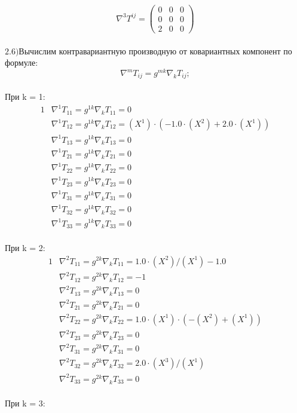 \documentclass[a4paper, 12pt, oneside]{article}
\begin{document}
\[
\nabla^3T^{ij} = \begin{pmatrix}
	0 & 0 & 0\\
	0 & 0 & 0\\
	2 & 0 & 0
\end{pmatrix}
\]\\
$\mathrm{2.6) }$Вычислим контравариантную производную от ковариантных компонент по формуле:\\
\[
\nabla^mT_{ij} = g^{mk}\nabla_kT_{ij};
\]\\
При k = 1:\\
\begin{alignat*}{1}
  & \nabla^1T_{11} = g^{1k}\nabla_kT_{11} = 0 \\
  & \nabla^1T_{12} = g^{1k}\nabla_kT_{12} = (X^1)\cdot (-1.0\cdot (X^2) + 2.0\cdot (X^1)) \\
  & \nabla^1T_{13} = g^{1k}\nabla_kT_{13} = 0 \\
  & \nabla^1T_{21} = g^{1k}\nabla_kT_{21} = 0 \\
  & \nabla^1T_{22} = g^{1k}\nabla_kT_{22} = 0 \\
  & \nabla^1T_{23} = g^{1k}\nabla_kT_{23} = 0 \\
  & \nabla^1T_{31} = g^{1k}\nabla_kT_{31} = 0 \\
  & \nabla^1T_{32} = g^{1k}\nabla_kT_{32} = 0 \\
  & \nabla^1T_{33} = g^{1k}\nabla_kT_{33} = 0 
\end{alignat*}\\
При k = 2:\\
\begin{alignat*}{1}
  & \nabla^2T_{11} = g^{2k}\nabla_kT_{11} = 1.0\cdot (X^2)/(X^1) - 1.0 \\
  & \nabla^2T_{12} = g^{2k}\nabla_kT_{12} = -1 \\
  & \nabla^2T_{13} = g^{2k}\nabla_kT_{13} = 0 \\
  & \nabla^2T_{21} = g^{2k}\nabla_kT_{21} = 0 \\
  & \nabla^2T_{22} = g^{2k}\nabla_kT_{22} = 1.0\cdot (X^1)\cdot (-(X^2) + (X^1)) \\
  & \nabla^2T_{23} = g^{2k}\nabla_kT_{23} = 0 \\
  & \nabla^2T_{31} = g^{2k}\nabla_kT_{31} = 0 \\
  & \nabla^2T_{32} = g^{2k}\nabla_kT_{32} = 2.0\cdot (X^3)/(X^1) \\
  & \nabla^2T_{33} = g^{2k}\nabla_kT_{33} = 0 
\end{alignat*}\\
При k = 3:\\
\end{document}

